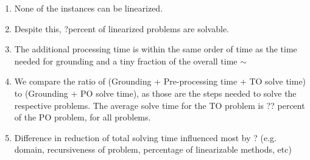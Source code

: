 \begin{enumerate}
	\item None of the instances can be linearized.
	\item Despite this, ?percent of linearized problems are solvable.
	\item The additional processing time is within the same order of time as the time needed for grounding and a tiny fraction of the overall time $\sim$
	\item We compare the ratio of (Grounding + Pre-processing time + TO solve time) to (Grounding + PO solve time), as those
	are the steps needed to solve the respective problems. The average solve time for the TO problem is ?? percent of the PO problem, for all problems.
	\item Difference in reduction of total solving time influenced most by ? (e.g. domain, recursiveness of problem, percentage of linearizable methods, etc)
\end{enumerate}